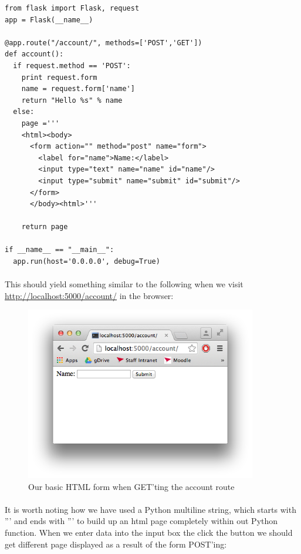 \documentclass[12pt, a4paper, twoside]{book}
\begin{document}
\begin{lstlisting}
from flask import Flask, request
app = Flask(__name__)

@app.route("/account/", methods=['POST','GET'])
def account():
  if request.method == 'POST':
    print request.form
    name = request.form['name']
    return "Hello %s" % name
  else:
    page ='''
    <html><body>
      <form action="" method="post" name="form">
        <label for="name">Name:</label>
        <input type="text" name="name" id="name"/>
        <input type="submit" name="submit" id="submit"/>
      </form>
      </body><html>'''

    return page
    
if __name__ == "__main__":
  app.run(host='0.0.0.0', debug=True)
\end{lstlisting}

\paragraph{} This should yield something similar to the following when we visit \url{http://localhost:5000/account/} in the browser:

\begin{figure}[H]
\centering
\includegraphics[width=0.9\textwidth]{images/flask-form.png}
\caption{Our basic HTML form when GET'ting the account route}
\label{fig:flask-form}
\end{figure}

\paragraph{} It is worth noting how we have used a Python multiline string, which starts with ''' and ends with ''' to build up an html page completely within out Python function. When we enter data into the input box the click the button we should get different page displayed as a result of the form POST'ing:
\end{document}
